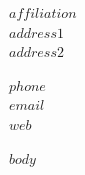 \documentclass[11pt,letterpaper,oneside]{article}
\date{}
\begin{document}
\thispagestyle{empty}


\begin{minipage}[t]{3.5in} 
  \flushright 
  \footnotesize {$affiliation$} \\
  \footnotesize {$address1$} \\
  \footnotesize {$address2$} 
\end{minipage}
\hfill     
\hfill
\begin{minipage}[t]{2in}
  \flushright 
  \footnotesize {$phone$} \, \faPhone \\
  {\footnotesize {\href{mailto:$email$}{$email$}} \, \faEnvelope} \\
  {\footnotesize {\href{https://www.$web$}{$web$}} \, \faGlobe}
\end{minipage}

\vspace{3em}

\reversemarginpar

\vspace{1em}

$body$
    
\end{document}
